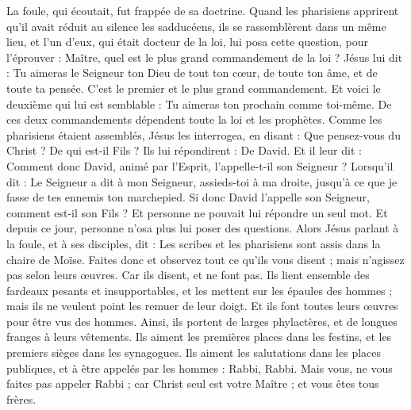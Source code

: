 \begin{multicols}{2}
La foule, qui écoutait, fut frappée de sa doctrine.
Quand les pharisiens apprirent qu'il avait réduit au silence les sadducéens, ils se rassemblèrent dans un même lieu,
et l'un d'eux, qui était docteur de la loi, lui posa cette question, pour l'éprouver :
Maître, quel est le plus grand commandement de la loi ?
Jésus lui dit : Tu aimeras le Seigneur ton Dieu de tout ton cœur, de toute ton âme, et de toute ta pensée.
C’est le premier et le plus grand commandement.
Et voici le deuxième qui lui est semblable : Tu aimeras ton prochain comme toi-même.
De ces deux commandements dépendent toute la loi et les prophètes.
Comme les pharisiens étaient assemblés, Jésus les interrogea,
en disant : Que pensez-vous du Christ ? De qui est-il Fils ? Ils lui répondirent : De David.
Et il leur dit : Comment donc David, animé par l'Esprit, l'appelle-t-il son Seigneur ? Lorsqu’il dit :
Le Seigneur a dit à mon Seigneur, assieds-toi à ma droite, jusqu'à ce que je fasse de tes ennemis ton marchepied{}.
Si donc David l'appelle son Seigneur, comment est-il son Fils ?
Et personne ne pouvait lui répondre un seul mot. Et depuis ce jour, personne n'osa plus lui poser des questions.
\VerseOne{}Alors Jésus parlant à la foule, et à ses disciples,
dit : Les scribes et les pharisiens sont assis dans la chaire de Moïse.
Faites donc et observez tout ce qu’ils vous disent ; mais n’agissez pas selon leurs œuvres. Car ils disent, et ne font pas.
Ils lient ensemble des fardeaux pesants et insupportables, et les mettent sur les épaules des hommes ; mais ils ne veulent point les remuer de leur doigt.
Et ils font toutes leurs œuvres pour être vus des hommes. Ainsi, ils portent de larges phylactères, et de longues franges à leurs vêtements.
Ils aiment les premières places dans les festins, et les premiers sièges dans les synagogues.
Ils aiment les salutations dans les places publiques, et à être appelés par les hommes : Rabbi, Rabbi.
Mais vous, ne vous faites pas appeler Rabbi ; car Christ seul est votre Maître ; et vous êtes tous frères.

\end{multicols}
